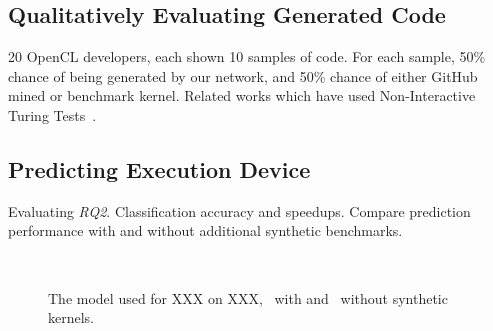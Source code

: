 \documentclass[preprint,nonatbib,10pt,nocopyrightspace]{sigplanconf}
\begin{document}
\subsection{Qualitatively Evaluating Generated Code}\label{subsec:}

20 OpenCL developers, each shown 10 samples of code. For each sample,
50\% chance of being generated by our network, and 50\% chance of
either GitHub mined or benchmark kernel. Related works which have used
Non-Interactive Turing Tests~\cite{Gao2015a,Zhang2016}.


\subsection{Predicting Execution Device}\label{subsec:}

Evaluating \emph{RQ2}. Classification accuracy and speedups. Compare
prediction performance with and without additional synthetic
benchmarks.

\begin{figure}%
  \\
  \caption{%
    The model used for XXX on XXX, \protect{}~with and
    \protect{}~without synthetic kernels.%
  }
  \label{fig:trees}
\end{figure}
\end{document}
